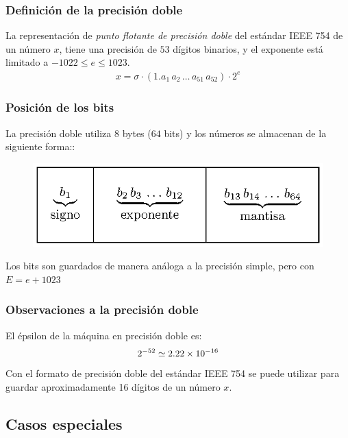 \documentclass[12pt]{beamer}
\begin{document}
\begin{frame}
\frametitle{Definición de la precisión doble}
La representación de \emph{\textcolor{darkspringgreen}{punto flotante de precisión doble}} del estándar IEEE 754 de un número $x$, tiene una precisión de $53$ dígitos binarios, y el exponente está limitado a $-1022 \leq e \leq 1023$.
\pause
\begin{align*}
x = \sigma \cdot (1.a_{1} \, a_{2} \, \ldots \, a_{51} \, a_{52}) \cdot 2^{e}
\end{align*}
\end{frame}
\begin{frame}
\frametitle{Posición de los bits}
La precisión doble utiliza $8$ bytes ($64$ bits) y los números se almacenan de la siguiente forma::
\pause
\begin{figure}
    \centering
    \includegraphics[scale=1.2]{Imagenes/precision_doble.eps}
\end{figure}
\vspace*{-1cm}
Los bits son guardados de manera análoga a la precisión simple, pero con $E = e + 1023$
\end{frame}
\begin{frame}
\frametitle{Observaciones a la precisión doble}
El épsilon de la máquina en precisión doble es:
\pause
\begin{align*}
2^{-52} \simeq \num{2.22d-16}
\end{align*}
\pause
Con el formato de precisión doble del estándar IEEE 754 se puede utilizar para guardar aproximadamente 16 dígitos de un número $x$.
\end{frame}

\subsection*{Casos especiales}
\end{document}
